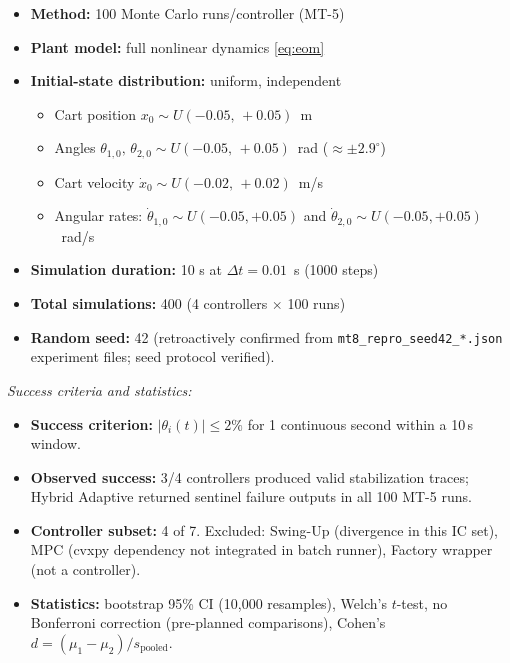 \documentclass[10pt, a4paper]{article}
\begin{document}
\begin{itemize}[noitemsep]
  \item \textbf{Method:} 100 Monte Carlo runs/controller (MT-5)
  \item \textbf{Plant model:} full nonlinear dynamics \eqref{eq:eom}
  \item \textbf{Initial-state distribution:} uniform, independent
    \begin{itemize}[noitemsep]
      \item Cart position $x_0 \sim U(-0.05,\, +0.05)$~m
      \item Angles $\theta_{1,0},\, \theta_{2,0} \sim U(-0.05,\, +0.05)$~rad ($\approx\pm2.9^\circ$)
      \item Cart velocity $\dot{x}_0 \sim U(-0.02,\, +0.02)$~m/s
      \item Angular rates: $\dot{\theta}_{1,0} \sim U(-0.05,+0.05)$ and
            $\dot{\theta}_{2,0} \sim U(-0.05,+0.05)$~rad/s
    \end{itemize}
  \item \textbf{Simulation duration:} 10 s at $\Delta t = 0.01$~s (1000 steps)
  \item \textbf{Total simulations:} 400 (4 controllers $\times$ 100 runs)
  \item \textbf{Random seed:} 42 (retroactively confirmed from
  \texttt{mt8\_repro\_seed42\_*.json} experiment files; seed protocol verified).
\end{itemize}

\noindent\textit{Success criteria and statistics:}

\begin{itemize}[noitemsep]
  \item \textbf{Success criterion:} $|\theta_i(t)| \leq 2\%$ for 1 continuous second
        within a 10\,s window.
  \item \textbf{Observed success:} 3/4 controllers produced valid stabilization traces;
        Hybrid Adaptive returned sentinel failure outputs in all 100 MT-5 runs.
  \item \textbf{Controller subset:} 4 of 7.
        Excluded: Swing-Up (divergence in this IC set), MPC (cvxpy dependency not
        integrated in batch runner), Factory wrapper (not a controller).
  \item \textbf{Statistics:} bootstrap 95\% CI (10,000 resamples), Welch's $t$-test,
        no Bonferroni correction (pre-planned comparisons), Cohen's
        $d = (\mu_1 - \mu_2)/s_\text{pooled}$.
\end{itemize}
\end{document}
